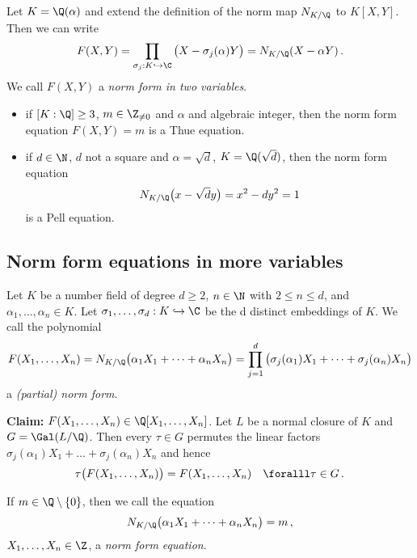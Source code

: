 \begin{defn*}
	Let \( K = \Q(\alpha) \) and extend the definition of the norm map \( N_{K/\Q} \) to \( K[X,Y] \).
	Then we can write
	\[ F(X,Y) = \prod_{\sigma_j: K \hookrightarrow \C} \big(X - \sigma_j(\alpha) Y \big) = N_{K/\Q} (X - \alpha Y) \,. \]
	We call \( F(X,Y) \) a \emph{norm form in two variables}.
\end{defn*}


\begin{exmp*}
	\begin{itemize}
		\item if \( [K:\Q] \geq 3 \), \( m \in \Z_{\neq 0} \) and \( \alpha \) and algebraic integer, then the norm form equation \( F(X,Y) = m \) is a Thue equation.
		\item if \( d \in \N \), \( d \) not a square and \( \alpha = \sqrt{d} \), \( K = \Q(\sqrt{d}) \), then the norm form equation
			\[ N_{K/\Q} \big(x-\sqrt{d}y\big) = x^2 - dy^2 = 1 \]
			is a Pell equation.
	\end{itemize}
\end{exmp*}

\subsection*{Norm form equations in more variables}

\begin{defn*}
	Let \( K \) be a number field of degree \( d \geq 2 \), \( n \in \N \) with \( 2 \leq n \leq d \), and \( \alpha_1, \dotsc, \alpha_n \in K \).
	Let \( \sigma_1, \dotsc, \sigma_d: K \hookrightarrow \C \) be the d distinct embeddings of \( K \).
	We call the polynomial
	\[ F(X_1, \dotsc, X_n) = N_{K/\Q} \big( \alpha_1 X_1 + \dots + \alpha_n X_n \big) = \prod_{j=1}^{d} \big( \sigma_j(\alpha_1) X_1 + \dots + \sigma_j(\alpha_n) X_n \big) \]
	a \emph{(partial) norm form}.
\end{defn*}

\textbf{Claim:} \( F(X_1, \dotsc, X_n) \in \Q[X_1, \dotsc, X_n] \).
Let \( L \) be a normal closure of \( K \) and \( G = \Gal(L / \Q) \).
Then every \( \tau \in G \) permutes the linear factors \( \sigma_j(\alpha_1) X_1 + \dots + \sigma_j(\alpha_n) X_n \) and hence
\[ \tau\big(F(X_1, \dotsc, X_n)\big) = F(X_1, \dotsc, X_n) \quad \foralll \tau \in G \,. \]

\begin{defn*} 
	If \( m \in \Q \setminus \{0\} \), then we call the equation
	\begin{equation}\label{eq:5.4}
		N_{K/\Q} \big(\alpha_1 X_1 + \dots + \alpha_n X_n\big) = m \,,
	\end{equation}
	\( X_1, \dotsc, X_n \in \Z \), a \emph{norm form equation}.
\end{defn*}

